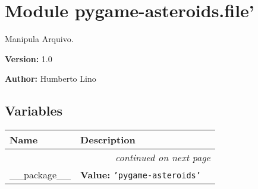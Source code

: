 %
%
%


\section{Module pygame-asteroids.file'}

    \label{pygame-asteroids:file'}
Manipula Arquivo.

\textbf{Version:} 1.0



\textbf{Author:} Humberto Lino





  \subsection{Variables}

    \vspace{-1cm}
\hspace{\varindent}\begin{longtable}{|p{\varnamewidth}|p{\vardescrwidth}|l}
\cline{1-2}
\cline{1-2} \centering \textbf{Name} & \centering \textbf{Description}& \\
\cline{1-2}
\endhead\cline{1-2}\multicolumn{3}{r}{\small\textit{continued on next page}}\\\endfoot\cline{1-2}
\endlastfoot\raggedright \_\-\_\-p\-a\-c\-k\-a\-g\-e\-\_\-\_\- & \raggedright \textbf{Value:} 
{\tt \texttt{'}\texttt{pygame-asteroids}\texttt{'}}&\\
\cline{1-2}
\end{longtable}



